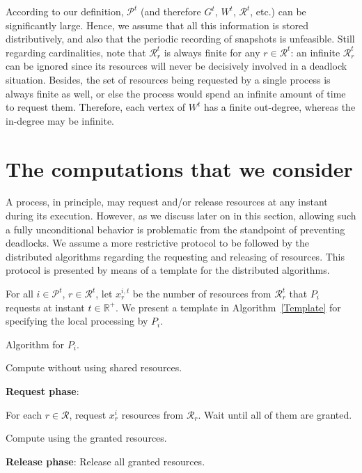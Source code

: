 \documentclass{article}
\newcommand{\Real}{{\mathbb R}}
\newcommand{\R}{\mathcal{R}}
\begin{document}
According to our definition, $\mathcal{P}^t$ (and therefore $G^t$, $W^t$,
$\R^t$, etc.) can be significantly large. Hence, we assume that all this
information is stored distributively, and also that the periodic recording of
snapshots is unfeasible. Still regarding cardinalities, note that $\R^t_r$ is
always finite for any $r \in \R^t$: an infinite $\R^t_r$ can be ignored since
its resources will never be decisively involved in a deadlock situation.
Besides, the set of resources being requested by a single process is always
finite as well, or else the process would spend an infinite amount of time to
request them. Therefore, each vertex of $W^t$ has a finite out-degree, whereas
the in-degree may be infinite.

\section{The computations that we consider}

A process, in principle, may request and/or release resources at any instant
during its execution. However, as we discuss later on in this section, allowing
such a fully unconditional behavior is problematic from the standpoint of
preventing deadlocks. We assume a more restrictive protocol to be followed by
the distributed algorithms regarding the requesting and releasing of resources.
This protocol is presented by means of a template for the distributed
algorithms. 

For all $i \in \mathcal{P}^t$, $r \in \R^t$, let $x^{i,t}_r$ be the number of
resources from $\R^t_r$ that $P_i$ requests at instant $t \in \Real^+$. We
present a template in Algorithm~\ref{Template} for specifying the local
processing by $P_i$. 

\begin{algorithm}[t]
	\caption{Algorithm for $P_i$.}
	\label{Template}
	\begin{algorithmic}[1]
				\State \parbox[t]{0.8\textwidth}{Compute without using shared resources.}
				\State \parbox[t]{0.8\textwidth}{\textbf{Request phase}: \parbox[t]{0.6\textwidth}{For each $r \in \R$, request $x^i_r$ resources from $\R_r$. Wait until all of them are granted.}}
				\State \parbox[t]{0.8\textwidth}{Compute using the granted resources.}
				\State \parbox[t]{0.8\textwidth}{\textbf{Release phase}: Release all granted resources.} \label{Template-Release}
			\EndWhile
		\EndProcedure
	\end{algorithmic}
\end{algorithm}
\end{document}
